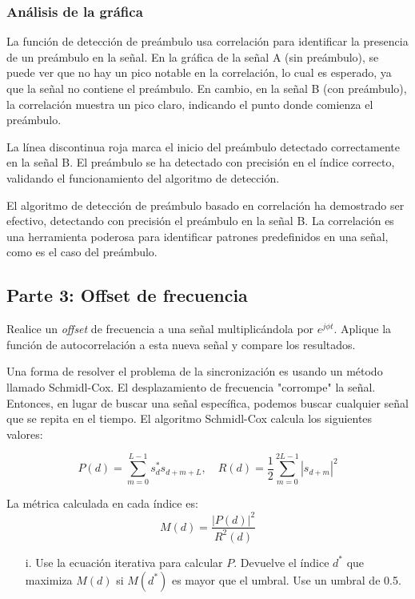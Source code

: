 \documentclass[letterpaper,12pt,oneside]{article}
\begin{document}
\subsubsection*{Análisis de la gráfica}
La función de detección de preámbulo usa correlación para identificar la presencia de un preámbulo en la señal. En la gráfica de la señal A (sin preámbulo), se puede ver que no hay un pico notable en la correlación, lo cual es esperado, ya que la señal no contiene el preámbulo. En cambio, en la señal B (con preámbulo), la correlación muestra un pico claro, indicando el punto donde comienza el preámbulo.

La línea discontinua roja marca el inicio del preámbulo detectado correctamente en la señal B. El preámbulo se ha detectado con precisión en el índice correcto, validando el funcionamiento del algoritmo de detección.

El algoritmo de detección de preámbulo basado en correlación ha demostrado ser efectivo, detectando con precisión el preámbulo en la señal B. La correlación es una herramienta poderosa para identificar patrones predefinidos en una señal, como es el caso del preámbulo.

\subsection{Parte 3: Offset de frecuencia}
Realice un \textit{offset} de frecuencia a una señal multiplicándola por \(e^{j\phi t}\). Aplique la función de autocorrelación a esta nueva señal y compare los resultados.

Una forma de resolver el problema de la sincronización es usando un método llamado Schmidl-Cox. El desplazamiento de frecuencia "corrompe" la señal. Entonces, en lugar de buscar una señal específica, podemos buscar cualquier señal que se repita en el tiempo. El algoritmo Schmidl-Cox calcula los siguientes valores:

\[
P(d) = \sum_{m=0}^{L-1} s_d^* s_{d+m+L}, \quad R(d) = \frac{1}{2} \sum_{m=0}^{2L-1} |s_{d+m}|^2
\]

La métrica calculada en cada índice es:
\[
M(d) = \frac{|P(d)|^2}{R^2(d)}
\]

\begin{itemize}
    \item[i.] Use la ecuación iterativa para calcular \(P\). Devuelve el índice \(d^*\) que maximiza \(M(d)\) si \(M(d^*)\) es mayor que el umbral. Use un umbral de 0.5.
\end{itemize}
\end{document}
